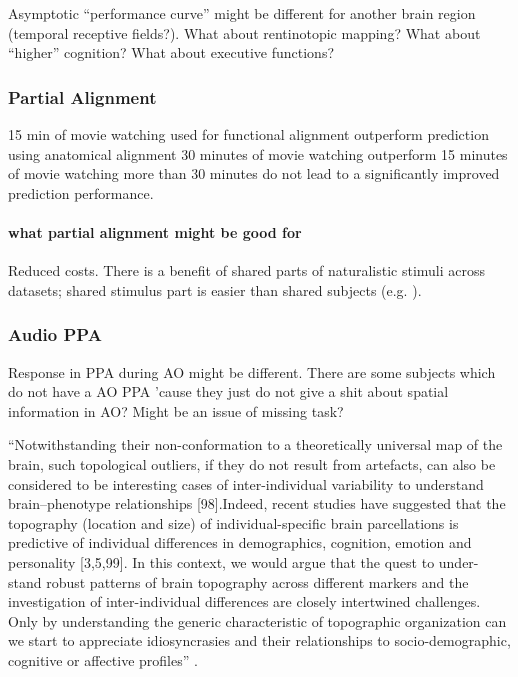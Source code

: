%
Asymptotic ``performance curve'' might be different for another brain region
(temporal receptive fields?).
%
What about rentinotopic mapping?
%
What about ``higher'' cognition?
%
What about executive functions?


\subsubsection{Partial Alignment}
%
15 min of movie watching used for functional alignment outperform prediction
using anatomical alignment
%
30 minutes of movie watching outperform 15 minutes of movie watching
%
more than 30 minutes do not lead to a significantly improved prediction
performance.


\paragraph{what partial alignment might be good for}
%
Reduced costs.
%
There is a benefit of shared parts of naturalistic stimuli across datasets;
shared stimulus part is easier than shared subjects (e.g.
\citep{zhang2018transfer}).


\subsubsection{Audio PPA}

%
Response in PPA during AO might be different.
%
There are some subjects which do not have a AO PPA 'cause they just do not give
a shit about spatial information in AO? Might be an issue of missing task?


``Notwithstanding their non-conformation to a theoretically universal map of the
brain, such topological outliers, if they do not result from artefacts, can also
be considered to be interesting cases of inter-individual variability to
understand brain–phenotype relationships [98].Indeed, recent studies have
suggested that the topography (location and size) of individual-specific brain
parcellations is predictive of individual differences in demographics,
cognition, emotion and personality [3,5,99]. In this context, we would argue
that the quest to under- stand robust patterns of brain topography across
different markers and the investigation of inter-individual differences are
closely intertwined challenges. Only by understanding the generic characteristic
of topographic organization can we start to appreciate idiosyncrasies and their
relationships to socio-demographic, cognitive or affective profiles''
\citep{eickhoff2018imaging}.

